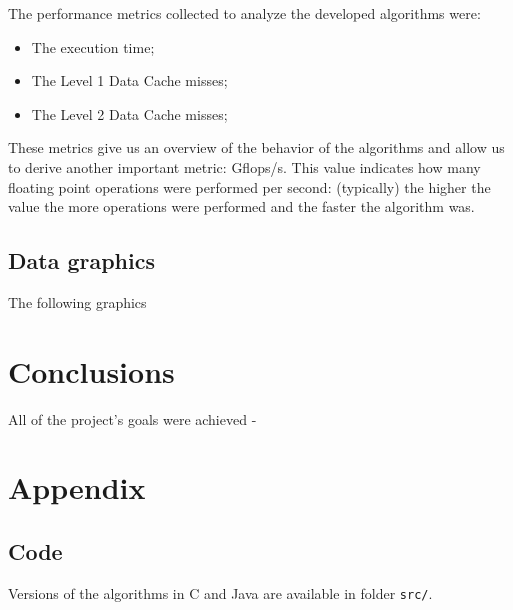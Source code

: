 \documentclass[11pt,a4paper]{article}
\begin{document}
The performance metrics collected to analyze the developed algorithms were:

\begin{itemize}
    \item The execution time;
    \item The Level 1 Data Cache misses;
    \item The Level 2 Data Cache misses;
\end{itemize}

These metrics give us an overview of the behavior of the algorithms and allow us to derive another important metric: Gflops/s. This value indicates how many floating point operations were performed per second: (typically) the higher the value the more operations were performed and the faster the algorithm was.

\subsection{Data graphics}

The following graphics

\section{Conclusions}

All of the project's goals were achieved -

\onecolumn
\appendix
\section{Appendix}

\subsection{Code}

\noindent Versions of the algorithms in C and Java are available in folder \lstinline{src/}.
\end{document}
